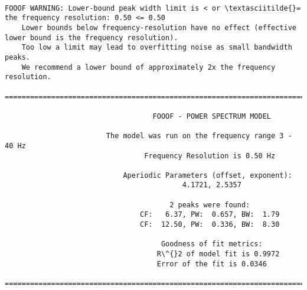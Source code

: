 \documentclass[11pt]{article}
\begin{document}
    \begin{Verbatim}[commandchars=\\\{\}]

FOOOF WARNING: Lower-bound peak width limit is < or \textasciitilde{}= the frequency resolution: 0.50 <= 0.50
	Lower bounds below frequency-resolution have no effect (effective lower bound is the frequency resolution).
	Too low a limit may lead to overfitting noise as small bandwidth peaks.
	We recommend a lower bound of approximately 2x the frequency resolution.

==================================================================================================
                                                                                                  
                                   FOOOF - POWER SPECTRUM MODEL                                   
                                                                                                  
                        The model was run on the frequency range 3 - 40 Hz                        
                                 Frequency Resolution is 0.50 Hz                                  
                                                                                                  
                            Aperiodic Parameters (offset, exponent):                              
                                          4.1721, 2.5357                                          
                                                                                                  
                                       2 peaks were found:                                        
                                CF:   6.37, PW:  0.657, BW:  1.79                                 
                                CF:  12.50, PW:  0.336, BW:  8.30                                 
                                                                                                  
                                     Goodness of fit metrics:                                     
                                    R\^{}2 of model fit is 0.9972                                    
                                    Error of the fit is 0.0346                                    
                                                                                                  
==================================================================================================

    \end{Verbatim}
\end{document}
